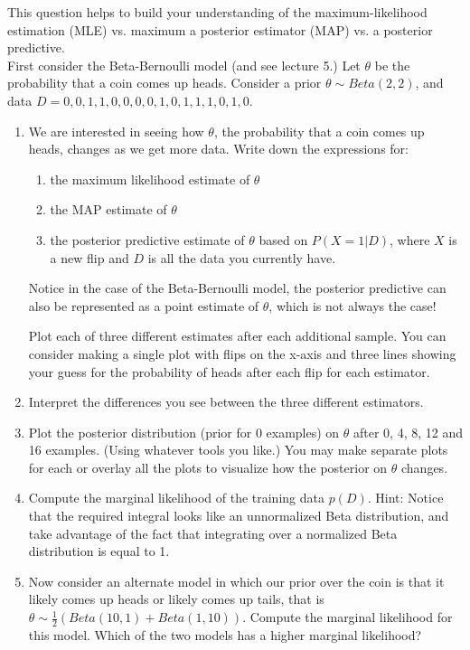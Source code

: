 \documentclass[submit]{harvardml}
\begin{document}
\newpage
\begin{problem}

  This question helps to build your understanding of the
  maximum-likelihood estimation (MLE) vs. maximum a posterior
  estimator (MAP) vs. a posterior predictive.\\

  First consider the Beta-Bernoulli model (and see lecture 5.)  Let
  $\theta$ be the probability that a coin comes up heads.  Consider a
  prior $\theta\sim Beta(2,2)$, and data $D= 0, 0, 1, 1, 0, 0, 0, 0,
  1, 0, 1, 1, 1, 0, 1, 0$.

%
\begin{enumerate}

\item 
We are interested in seeing how $\theta$, the probability that a coin comes up heads, changes as we get more data.
 Write down the expressions for: 
 \begin{enumerate}
     \item the maximum likelihood estimate of $\theta$
     \item the MAP estimate of $\theta$
     \item the posterior predictive estimate of $\theta$ based on $P(X = 1 | D)$, where $X$ is a new flip and $D$ is all the data you currently have.
 \end{enumerate} 
 Notice in the case of the Beta-Bernoulli model, the posterior predictive can also be represented as a point estimate of $\theta$, which is not always the case! 
 
 Plot each of three different estimates after each
  additional sample.  You can consider making a single plot with
  flips on the x-axis and three lines showing your guess for the
  probability of heads after each flip for each estimator.

%
\item Interpret the differences you see between the three different
estimators.
% 
\item Plot the posterior distribution (prior for 0 examples) on $\theta$ after 0, 4, 8, 12 and 16 examples. (Using whatever tools you like.)  You may make separate plots for each or overlay all the plots to visualize how the posterior on $\theta$ changes.
%

\item Compute the marginal likelihood of the training data $p(D)$.
  Hint: Notice that the required integral looks like an unnormalized
  Beta distribution, and take advantage of the fact that integrating
  over a normalized Beta distribution is equal to 1.
\item Now consider an alternate model in which our prior over the coin
  is that it likely comes up heads or likely comes up tails, that is
  $\theta \sim \frac{1}{2}( Beta(10,1) + Beta(1,10) )$.  Compute the marginal
  likelihood for this model.  Which of the two models has a higher
  marginal likelihood?
\end{enumerate}
 \end{problem}
\end{document}
